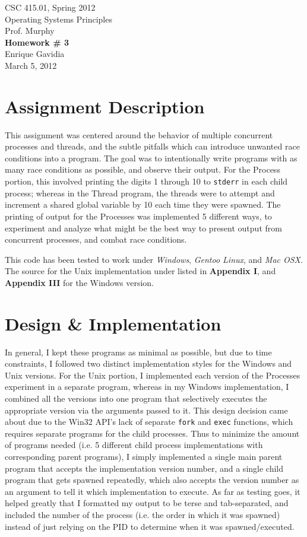 \documentclass[12pt]{article}
\def \name       {Enrique Gavidia}
\def \coursenum  {CSC 415.01}
\def \coursename {Operating Systems Principles}
\def \instructor {Prof. Murphy}
\def \semester   {Spring 2012}
\def \assignment {Homework \# 3}
\def \duedate    {March 5, 2012}
\newcommand {\makecover} {
  \begin{titlepage}
    \begin{center}
      \LARGE{\coursenum, \semester \\ \coursename}\\
      \Large{\instructor}\\
      \vfill
      \textbf{\Huge \assignment}\\
      \vfill
      \Large{\name}\\
      \large{\duedate}
    \end{center}
  \end{titlepage}
}
\begin{document}
\makecover

\section*{Assignment Description}
This assignment was centered around the behavior of multiple concurrent processes and threads, and the subtle pitfalls which can introduce
unwanted race conditions into a program. The goal was to intentionally write programs with as many race conditions as possible, and observe
their output. For the Process portion, this involved printing the digits 1 through 10 to \texttt{stderr} in each child process; whereas in
the Thread program, the threads were to attempt and increment a shared global variable by 10 each time they were spawned. The printing of 
output for the Processes was implemented 5 different ways, to experiment and analyze what might be the best way to present output from
concurrent processes, and combat race conditions.

This code has been tested to work under \textsl{Windows}, \textsl{Gentoo Linux}, and \textsl{Mac OSX}.
The source for the Unix implementation under listed in \textbf{Appendix I}, and \textbf{Appendix III} for the Windows version.

\section*{Design \& Implementation}
In general, I kept these programs as minimal as possible, but due to time constraints, I followed two distinct implementation styles for the 
Windows and Unix versions. For the Unix portion, I implemented each version of the Processes experiment in a separate program,
whereas in my Windows implementation, I combined all the versions into one program that selectively executes the appropriate version via the
arguments passed to it.  This design decision came about due to the Win32 API's lack of separate \texttt{fork} and \texttt{exec} functions,
which requires separate programs for the child processes. Thus to minimize the amount of programs needed (i.e. 5 different child process implementations
with corresponding parent programs), I simply implemented a single main parent program that accepts the implementation version number, and a single child 
program that gets spawned repeatedly, which also accepts the version number as an argument to tell it which implementation to execute.  As far as testing
goes, it helped greatly that I formatted my output to be terse and tab-separated, and included the number of the process (i.e. the order in which it was
spawned) instead of just relying on the PID to determine when it was spawned/executed.
\end{document}
